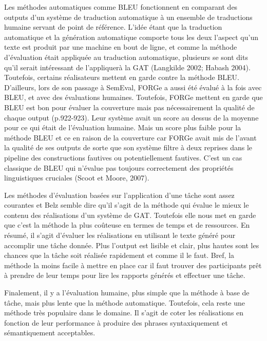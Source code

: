 Les méthodes automatiques comme BLEU fonctionnent en comparant des outputs d'un système de traduction automatique à un ensemble de traductions humaine servant de point de référence. L'idée étant que la traduction automatique et la génération automatique comporte tous les deux l'aspect qu'un texte est produit par une machine en bout de ligne, et comme la méthode d'évaluation était appliquée au traduction automatique, plusieurs se sont dits qu'il serait intéressant de l'appliquerà la \ac{GAT} (Langkilde 2002; Habash 2004). Toutefois, certains réalisateurs mettent en garde contre la méthode BLEU. D'ailleurs, lors de son passage à SemEval, FORGe a aussi été évalué à la fois avec BLEU, et avec des évaluations humaines. Toutefois, FORGe mettent en garde que BLEU est bon pour évaluer la couverture mais pas nécessairement la qualité de chaque output (p.922-923). Leur système avait un score au dessus de la moyenne pour ce qui était de l'évaluation humaine. Mais un score plus faible pour la méthode BLEU et ce en raison de la couverture car FORGe avait mis de l'avant la qualité de ses outputs de sorte que son système filtre à deux reprises dans le pipeline des constructions fautives ou potentiellement fautives. C'est un cas classique de BLEU qui n'évalue pas toujours correctement des propriétés linguistiques cruciales (Scoot et Moore, 2007).

Les méthodes d'évaluation basées sur l'application d'une tâche sont assez courantes \citep{ReiterInvestigationValidityMetrics2009} et Belz semble dire qu'il s'agit de la méthode qui évalue le mieux le contenu des réalisations d'un système de \ac{GAT}. Toutefois elle nous met en garde que c'est la méthode la plus coûteuse en termes de temps et de ressources. En résumé, il s'agit d'évaluer les réalisations en utilisant le texte généré pour accomplir une tâche donnée. Plus l'output est lisible et clair, plus hautes sont les chances que la tâche soit réalisée rapidement et comme il le faut. Bref, la méthode la moins facile à mettre en place car il faut trouver des participants prêt à prendre de leur temps pour lire les rapports générés et effectuer une tâche. 

Finalement, il y a l'évaluation humaine, plus simple que la méthode à base de tâche, mais plus lente que la méthode automatique. Toutefois, cela reste une méthode très populaire dans le domaine. Il s'agit de coter les réalisations en fonction de leur performance à produire des phrases syntaxiquement et sémantiquement acceptables.

